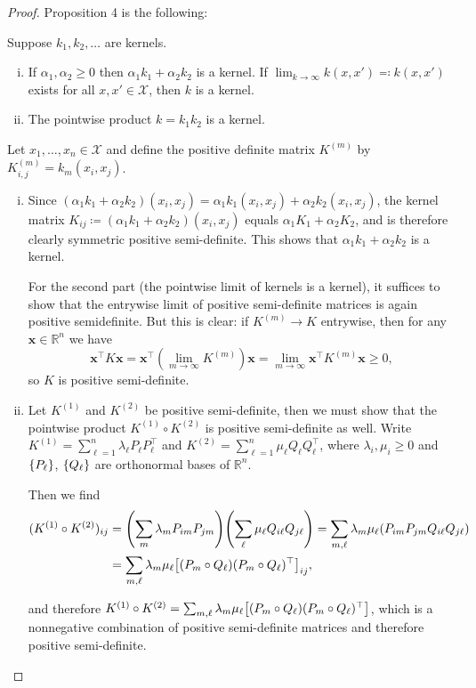 \documentclass{article}
\theoremstyle{plain}
\theoremstyle{remark}
\renewcommand{\vec}{\mathbf}
\newcommand{\Bb}{\mathbb}
\newcommand{\Cal}{\mathcal}
\newcommand{\RR}{\Bb R}
\newcommand{\T}{^\top} %
\newcommand\ceq\coloneqq %
\begin{document}
\begin{proof}
	Proposition 4 is the following:
	\begin{mdframed}
		Suppose $k_1, k_2, \dotsc$ are kernels. 
		\begin{enumerate}[(i)]
			\item If $\alpha_1, \alpha_2 \geq 0$ then $\alpha_1 k_1 + \alpha_2 k_2$ is a kernel. If $\lim_{k\to\infty} k(x, x') \eqqcolon k(x, x')$ exists for all $x, x' \in \Cal X$, then $k$ is a kernel. 
			\item The pointwise product $k = k_1k_2$ is a kernel.
		\end{enumerate}
	\end{mdframed}

Let $x_1, \dotsc, x_n \in \Cal X$ and define the positive definite matrix $K^{(m)}$ by $K^{(m)}_{i, j} = k_m(x_i, x_j)$. 
\begin{enumerate}[(i)]
	\item Since $(\alpha_1 k_1 + \alpha_2 k_2)(x_i, x_j) = \alpha_1 k_1(x_i, x_j) + \alpha_2 k_2(x_i, x_j)$, the kernel matrix $K_{ij} \ceq (\alpha_1 k_1 + \alpha_2 k_2)(x_i, x_j)$ equals $\alpha_1 K_1 + \alpha_2 K_2$, and is therefore clearly symmetric positive semi-definite. This shows that $\alpha_1 k_1 + \alpha_2 k_2$ is a kernel. 
	
	For the second part (the pointwise limit of kernels is a kernel), it suffices to show that the entrywise limit of positive semi-definite matrices is again positive semidefinite. But this is clear: if $K^{(m)} \to K$ entrywise, then for any $\vec x \in \RR^n$ we have
	\[
	\vec x\T K \vec x = \vec x\T (\lim_{m\to\infty} K^{(m)}) \vec x = \lim_{m\to\infty} \vec x\T K^{(m)}\vec x \geq 0,
	\]
	so $K$ is positive semi-definite.
	
	\item Let $K^{(1)}$ and $K^{(2)}$ be positive semi-definite, then we must show that the pointwise product $K^{(1)} \circ K^{(2)}$ is positive semi-definite as well. Write $K^{(1)} = \sum_{\ell=1}^n \lambda_\ell P_\ell P_\ell\T$ and $K^{(2)} = \sum_{\ell=1}^n \mu_\ell Q_\ell Q_\ell\T$, where $\lambda_i, \mu_i \geq 0$ and $\qty{P_\ell}$, $\qty{Q_\ell}$ are orthonormal bases of $\RR^n$. 
	
	Then we find
	\begin{align*}
	(K^{(1)} \circ K^{(2)})_{ij} &= \qty(\sum_m \lambda_m P_{im} P_{jm}) \qty(\sum_\ell \mu_\ell Q_{i\ell} Q_{j\ell}) = \sum_{m, \ell} \lambda_m \mu_\ell (P_{im} P_{jm} Q_{i\ell} Q_{j\ell}) \\
	&= \sum_{m, \ell} \lambda_m \mu_\ell \qty[(P_m \circ Q_\ell)(P_m \circ Q_\ell)\T]_{ij},
	\end{align*}
	
	and therefore $K^{(1)} \circ K^{(2)} = \sum_{m, \ell} \lambda_m \mu_\ell \qty[(P_m \circ Q_\ell)(P_m \circ Q_\ell)\T]$, which is a nonnegative combination of positive semi-definite matrices and therefore positive semi-definite. 
\end{enumerate}

\end{proof}
\end{document}
